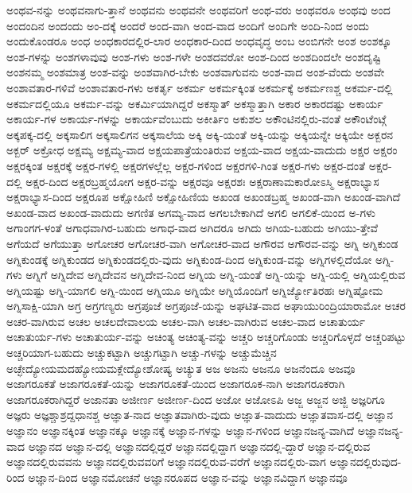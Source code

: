{ಅಂಥವ-ನನ್ನು
ಅಂಥವನಾಗು-ತ್ತಾನೆ
ಅಂಥವನು
ಅಂಥವನೇ
ಅಂಥವರಿಗೆ
ಅಂಥ-ವರು
ಅಂಥವರೂ
ಅಂಥವು
ಅಂದ
ಅಂದಂದಿನ
ಅಂದಂದು
ಅಂ-ದಕ್ಕೆ
ಅಂದರೆ
ಅಂದ-ವಾಗಿ
ಅಂದ-ವಾದ
ಅಂದಿಗೆ
ಅಂದಿಗೇ
ಅಂದಿ-ನಿಂದ
ಅಂದು
ಅಂದುಕೊಂಡರೂ
ಅಂಧ
ಅಂಧಕಾರದಲ್ಲಿರ-ಲಾರ
ಅಂಧಕಾರ-ದಿಂದ
ಅಂಧವೃದ್ಧ
ಅಂಬ
ಅಂಬಿಗನೇ
ಅಂಶ
ಅಂಶಕ್ಕೂ
ಅಂಶ-ಗಳನ್ನು
ಅಂಶಗಳಾವುವು
ಅಂಶ-ಗಳು
ಅಂಶ-ಗಳೇ
ಅಂಶದವರೋ
ಅಂಶ-ದಿಂದ
ಅಂಶದಿಂದಲೇ
ಅಂಶದೃಷ್ಟಿ
ಅಂಶನಮ್ಮ
ಅಂಶಮಾತ್ರ
ಅಂಶ-ವನ್ನು
ಅಂಶವಾಗಿರ-ಬೇಕು
ಅಂಶವಾಗುವನು
ಅಂಶ-ವಾದ
ಅಂಶ-ವೆಂದು
ಅಂಶವೇ
ಅಂಶಾವತಾರ-ಗಳಿವೆ
ಅಂಶಾವತಾರ-ಗಳು
ಅಕರ್ತೃ
ಅಕರ್ಮ
ಅಕರ್ಮಕ್ಕಿಂತ
ಅಕರ್ಮಕ್ಕೆ
ಅಕರ್ಮಣಶ್ಚ
ಅಕರ್ಮ-ದಲ್ಲಿ
ಅಕರ್ಮದಲ್ಲಿಯೂ
ಅಕರ್ಮ-ವನ್ನು
ಅಕರ್ಮಿಯಾಗಿದ್ದರೆ
ಅಕಸ್ಮಾತ್
ಅಕಸ್ಮಾತ್ತಾಗಿ
ಅಕಾರ
ಅಕಾರದಷ್ಟು
ಅಕಾರ್ಯ
ಅಕಾರ್ಯ-ಗಳ
ಅಕಾರ್ಯ-ಗಳನ್ನು
ಅಕಾರ್ಯವೆಂಬುದು
ಅಕೀರ್ತಿಂ
ಅಕುಶಲ
ಅಕೌಂಟಿನಲ್ಲಿರು-ವಂತೆ
ಅಕೌಂಟೆಂಟ್ಗೆ
ಅಕ್ಕಪಕ್ಕ-ದಲ್ಲಿ
ಅಕ್ಕಸಾಲಿಗ
ಅಕ್ಕಸಾಲಿಗನ
ಅಕ್ಕಸಾಲೆಯ
ಅಕ್ಕಿ
ಅಕ್ಕಿ-ಯಂತೆ
ಅಕ್ಕಿ-ಯನ್ನು
ಅಕ್ಕಿಯನ್ನೇ
ಅಕ್ಕಿಯೇ
ಅಕ್ಬರನ
ಅಕ್ಬರ್
ಅಕ್ರೋಧ
ಅಕ್ಷಮ್ಯ
ಅಕ್ಷಮ್ಯ-ವಾದ
ಅಕ್ಷಯಪಾತ್ರೆಯಂತಿರುವ
ಅಕ್ಷಯ-ವಾದ
ಅಕ್ಷಯ-ವಾದುದು
ಅಕ್ಷರ
ಅಕ್ಷರಂ
ಅಕ್ಷರಕ್ಕಿಂತ
ಅಕ್ಷರಕ್ಕೆ
ಅಕ್ಷರ-ಗಳಲ್ಲಿ
ಅಕ್ಷರಗಳಲ್ಲೆಲ್ಲ
ಅಕ್ಷರ-ಗಳಿಂದ
ಅಕ್ಷರಗಳಿ-ಗಿಂತ
ಅಕ್ಷರ-ಗಳು
ಅಕ್ಷರ-ದಂತೆ
ಅಕ್ಷರ-ದಲ್ಲಿ
ಅಕ್ಷರ-ದಿಂದ
ಅಕ್ಷರಬ್ರಹ್ಮಯೋಗ
ಅಕ್ಷರ-ವನ್ನು
ಅಕ್ಷರವೂ
ಅಕ್ಷರಶಃ
ಅಕ್ಷರಾಣಾಮಕಾರೋಽಸ್ಮಿ
ಅಕ್ಷರಾಭ್ಯಾಸ
ಅಕ್ಷರಾಭ್ಯಾಸ-ದಿಂದ
ಅಕ್ಷರೂಪ
ಅಕ್ಷೋಹಿಣಿ
ಅಕ್ಷೋಹಿಣಿಯ
ಅಖಂಡ
ಅಖಂಡಬ್ರಹ್ಮ
ಅಖಂಡ-ವಾಗಿ
ಅಖಂಡ-ವಾಗಿದೆ
ಅಖಂಡ-ವಾದ
ಅಖಂಡ-ವಾದುದು
ಅಗಣಿತ
ಅಗಮ್ಯ-ವಾದ
ಅಗಲಬೇಕಾಗಿದೆ
ಅಗಲಿ
ಅಗಲಿಕೆ-ಯಿಂದ
ಅ-ಗಳು
ಅಗಾಂಗಗ-ಳಂತೆ
ಅಗಾಧವಾಗಿರ-ಬಹುದು
ಅಗಾಧ-ವಾದ
ಅಗಿದರೂ
ಅಗಿದು
ಅಗಿಯ-ಬಹುದು
ಅಗಿಯು-ತ್ತೇವೆ
ಅಗೆಯದೆ
ಅಗೆಯುತ್ತಾ
ಅಗೋಚರ
ಅಗೋಚರ-ವಾಗಿ
ಅಗೋಚರ-ವಾದ
ಅಗೌರವ
ಅಗೌರವ-ವನ್ನು
ಅಗ್ನಿ
ಅಗ್ನಿಕುಂಡ
ಅಗ್ನಿಕುಂಡಕ್ಕೆ
ಅಗ್ನಿಕುಂಡದ
ಅಗ್ನಿಕುಂಡದಲ್ಲಿರು-ವುದು
ಅಗ್ನಿಕುಂಡ-ದಿಂದ
ಅಗ್ನಿಕುಂಡ-ವನ್ನು
ಅಗ್ನಿಗಳಲ್ಲಿದೆಯೋ
ಅಗ್ನಿ-ಗಳು
ಅಗ್ನಿಗೆ
ಅಗ್ನಿದೇವ
ಅಗ್ನಿದೇವನ
ಅಗ್ನಿದೇವ-ನಿಂದ
ಅಗ್ನಿಯ
ಅಗ್ನಿ-ಯಂತೆ
ಅಗ್ನಿ-ಯನ್ನು
ಅಗ್ನಿ-ಯಲ್ಲಿ
ಅಗ್ನಿಯಲ್ಲಿರುವ
ಅಗ್ನಿಯಷ್ಟು
ಅಗ್ನಿ-ಯಾಗಲಿ
ಅಗ್ನಿ-ಯಿಂದ
ಅಗ್ನಿಯೂ
ಅಗ್ನಿಯೇ
ಅಗ್ನಿಯೊಂದಿಗೆ
ಅಗ್ನಿರ್ಜ್ಯೋತಿರಹಃ
ಅಗ್ನಿಷ್ಟೋಮ
ಅಗ್ನಿಸಾಕ್ಷಿ-ಯಾಗಿ
ಅಗ್ರ
ಅಗ್ರಗಣ್ಯರು
ಅಗ್ರಪೂಜೆ
ಅಗ್ರಪೂಜೆ-ಯನ್ನು
ಅಘಟಿತ-ವಾದ
ಅಘಾಯುರಿಂದ್ರಿಯಾರಾಮೋ
ಅಚರ
ಅಚರ-ವಾಗಿರುವ
ಅಚಲ
ಅಚಲದೇವಾಲಯ
ಅಚಲ-ವಾಗಿ
ಅಚಲ-ವಾಗಿರುವ
ಅಚಲ-ವಾದ
ಅಚಾತುರ್ಯ
ಅಚಾತುರ್ಯ-ಗಳು
ಅಚಾತುರ್ಯ-ವನ್ನು
ಅಚಿಂತ್ಯ
ಅಚಿಂತ್ಯ-ವನ್ನು
ಅಚ್ಚರಿ
ಅಚ್ಚರಿಗೊಂಡು
ಅಚ್ಚರಿಗೊಳ್ಳದೆ
ಅಚ್ಚರಿಪಟ್ಟು
ಅಚ್ಚರಿಯಾಗ-ಬಹುದು
ಅಚ್ಚುಕಟ್ಟಾಗಿ
ಅಚ್ಚುಗಟ್ಟಾಗಿ
ಅಚ್ಚು-ಗಳನ್ನು
ಅಚ್ಚುಮೆಚ್ಚಿನ
ಅಚ್ಛೇದ್ಯೋಯಮದಹ್ಯೋಯಮಕ್ಲೇದ್ಯೋಶೋಷ್ಯ
ಅಚ್ಯುತ
ಅಜ
ಅಜನು
ಅಜನೂ
ಅಜನೆಂದೂ
ಅಜವೂ
ಅಜಾಗರೂಕತೆ
ಅಜಾಗರೂಕತೆ-ಯನ್ನು
ಅಜಾಗರೂಕತೆ-ಯಿಂದ
ಅಜಾಗರೂಕ-ನಾಗಿ
ಅಜಾಗರೂಕರಾಗಿ
ಅಜಾಗರೂಕರಾಗಿದ್ದರೆ
ಅಜಾನತಾ
ಅಜೀರ್ಣ
ಅಜೀರ್ಣ-ದಿಂದ
ಅಜೋ
ಅಜೋಽಪಿ
ಅಜ್ಜ
ಅಜ್ಜನ
ಅಜ್ಜಿ
ಅಜ್ಞರಿಗೂ
ಅಜ್ಞರು
ಅಜ್ಞಶ್ಚಾಶ್ರದ್ದಧಾನಶ್ಚ
ಅಜ್ಞಾತ-ನಾದ
ಅಜ್ಞಾತವಾಗಿರು-ವುದು
ಅಜ್ಞಾತ-ವಾದುದು
ಅಜ್ಞಾತವಾಸ-ದಲ್ಲಿ
ಅಜ್ಞಾನ
ಅಜ್ಞಾನಂ
ಅಜ್ಞಾನಕ್ಕಿಂತ
ಅಜ್ಞಾನಕ್ಕೂ
ಅಜ್ಞಾನಕ್ಕೆ
ಅಜ್ಞಾನ-ಗಳನ್ನು
ಅಜ್ಞಾನ-ಗಳಿಂದ
ಅಜ್ಞಾನಜನ್ಯ-ವಾಗಿದೆ
ಅಜ್ಞಾನಜನ್ಯ-ವಾದ
ಅಜ್ಞಾನದ
ಅಜ್ಞಾನ-ದಲ್ಲಿ
ಅಜ್ಞಾನದಲ್ಲಿದ್ದರೆ
ಅಜ್ಞಾನದಲ್ಲಿದ್ದಾಗ
ಅಜ್ಞಾನದಲ್ಲಿ-ದ್ದಾರೆ
ಅಜ್ಞಾನ-ದಲ್ಲಿರುವ
ಅಜ್ಞಾನದಲ್ಲಿರುವವನು
ಅಜ್ಞಾನದಲ್ಲಿರುವವರಿಗೆ
ಅಜ್ಞಾನದಲ್ಲಿರುವ-ವರೆಗೆ
ಅಜ್ಞಾನದಲ್ಲಿರು-ವಾಗ
ಅಜ್ಞಾನದಲ್ಲಿರುವುದ-ರಿಂದ
ಅಜ್ಞಾನ-ದಿಂದ
ಅಜ್ಞಾನಮೋಚನೆ
ಅಜ್ಞಾನರೂಪದ
ಅಜ್ಞಾನ-ವನ್ನು
ಅಜ್ಞಾನವಿದ್ದಾಗ
ಅಜ್ಞಾನವೂ
}
